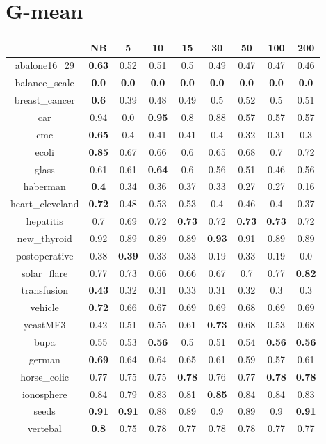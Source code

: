 \documentclass{article}%
\begin{document}
%
\section*{G{-}mean}%
\begin{tabular}{c|cccccccc}%
\hline%
&NB&5&10&15&30&50&100&200\\%
\hline%
abalone16\_29&\textbf{0.63}&0.52&0.51&0.5&0.49&0.47&0.47&0.46\\%
\hline%
balance\_scale&\textbf{0.0}&\textbf{0.0}&\textbf{0.0}&\textbf{0.0}&\textbf{0.0}&\textbf{0.0}&\textbf{0.0}&\textbf{0.0}\\%
\hline%
breast\_cancer&\textbf{0.6}&0.39&0.48&0.49&0.5&0.52&0.5&0.51\\%
\hline%
car&0.94&0.0&\textbf{0.95}&0.8&0.88&0.57&0.57&0.57\\%
\hline%
cmc&\textbf{0.65}&0.4&0.41&0.41&0.4&0.32&0.31&0.3\\%
\hline%
ecoli&\textbf{0.85}&0.67&0.66&0.6&0.65&0.68&0.7&0.72\\%
\hline%
glass&0.61&0.61&\textbf{0.64}&0.6&0.56&0.51&0.46&0.56\\%
\hline%
haberman&\textbf{0.4}&0.34&0.36&0.37&0.33&0.27&0.27&0.16\\%
\hline%
heart\_cleveland&\textbf{0.72}&0.48&0.53&0.53&0.4&0.46&0.4&0.37\\%
\hline%
hepatitis&0.7&0.69&0.72&\textbf{0.73}&0.72&\textbf{0.73}&\textbf{0.73}&0.72\\%
\hline%
new\_thyroid&0.92&0.89&0.89&0.89&\textbf{0.93}&0.91&0.89&0.89\\%
\hline%
postoperative&0.38&\textbf{0.39}&0.33&0.33&0.19&0.33&0.19&0.0\\%
\hline%
solar\_flare&0.77&0.73&0.66&0.66&0.67&0.7&0.77&\textbf{0.82}\\%
\hline%
transfusion&\textbf{0.43}&0.32&0.31&0.33&0.31&0.32&0.3&0.3\\%
\hline%
vehicle&\textbf{0.72}&0.66&0.67&0.69&0.69&0.68&0.69&0.69\\%
\hline%
yeastME3&0.42&0.51&0.55&0.61&\textbf{0.73}&0.68&0.53&0.68\\%
\hline%
bupa&0.55&0.53&\textbf{0.56}&0.5&0.51&0.54&\textbf{0.56}&\textbf{0.56}\\%
\hline%
german&\textbf{0.69}&0.64&0.64&0.65&0.61&0.59&0.57&0.61\\%
\hline%
horse\_colic&0.77&0.75&0.75&\textbf{0.78}&0.76&0.77&\textbf{0.78}&\textbf{0.78}\\%
\hline%
ionosphere&0.84&0.79&0.83&0.81&\textbf{0.85}&0.84&0.84&0.83\\%
\hline%
seeds&\textbf{0.91}&\textbf{0.91}&0.88&0.89&0.9&0.89&0.9&\textbf{0.91}\\%
\hline%
vertebal&\textbf{0.8}&0.75&0.78&0.77&0.78&0.78&0.77&0.77\\%
\hline%
\end{tabular}

%
\end{document}
